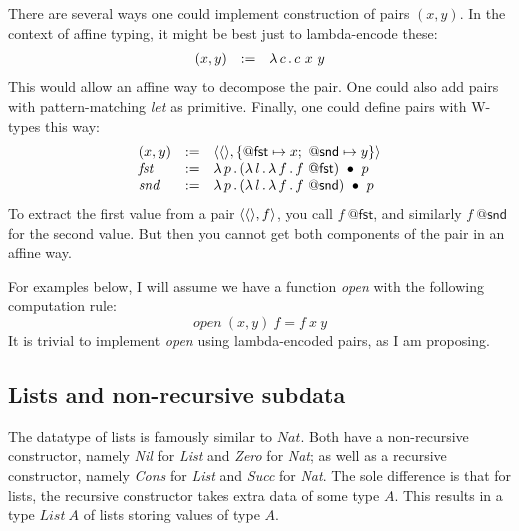 \documentclass{article}
\begin{document}
There are several ways one could implement construction of pairs $(x,y)$. In the context of affine typing, it might be
best just to lambda-encode these:
\[
\begin{array}{lll}
  (x,y) & := & \lambda\, c\, .\, c\ x\ y
\end{array}
\]
\noindent This would allow an affine way to decompose the pair.  One
could also add pairs with pattern-matching \emph{let} as primitive.
Finally, one could define pairs with W-types this way:
\[
\begin{array}{lll}
  (x,y) & := & \ctor{\wunit}{\{\mathsf{@fst} \mapsto x;\ \mathsf{@snd} \mapsto y\}} \\
  \textit{fst} & := & \lam{p}{\wrec{(\lam{l}{\lam{f}{f\ \mathsf{@fst}}})}{p}} \\
  \textit{snd} & := & \lam{p}{\wrec{(\lam{l}{\lam{f}{f\ \mathsf{@snd}}})}{p}} 
\end{array}
\]
\noindent To extract the first value from a pair $\langle \langle\rangle , f \rangle$,
you call $f\ \mathsf{@fst}$, and similarly $f\ \mathsf{@snd}$ for the
second value.  But then you cannot get both components of the pair
in an affine way.

For examples below, I will assume we have a function \textit{open}
with the following computation rule:
\[
\textit{open}\ (x,y)\ f = f\ x\ y
\]
\noindent It is trivial to implement \textit{open} using lambda-encoded
pairs, as I am proposing.

\subsection{Lists and non-recursive subdata}

The datatype of lists is famously similar to $\textit{Nat}$.  Both
have a non-recursive constructor, namely \textit{Nil} for
\textit{List} and \textit{Zero} for \textit{Nat}; as well as a
recursive constructor, namely \textit{Cons} for \textit{List} and
\textit{Succ} for \textit{Nat}.  The sole difference is that for
lists, the recursive constructor takes extra data of some type $A$.
This results in a type $\textit{List}\ A$ of lists storing values of
type $A$.
\end{document}
